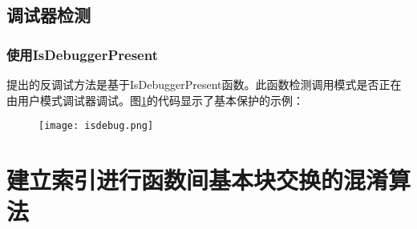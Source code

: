 \subsection{调试器检测}

\subsubsection{使用IsDebuggerPresent}

提出的反调试方法是基于IsDebuggerPresent函数。此函数检测调用模式是否正在由用户模式调试器调试。图\ref{isdebug}的代码显示了基本保护的示例：

\begin{figure}[htbp]
	\centering
	\texttt{[image: isdebug.png]}
	\label{isdebug}
\end{figure}


	




	

\section{建立索引进行函数间基本块交换的混淆算法}

